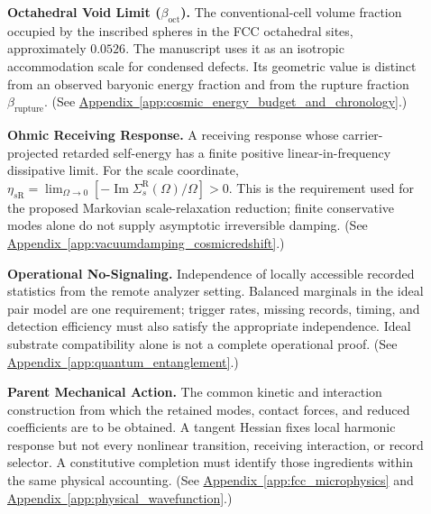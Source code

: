 \begin{description}
\item[] \begin{minipage}[t]{\linewidth}
\textbf{Octahedral Void Limit ($\beta_{\mathrm{oct}}$).} The conventional-cell volume fraction occupied by the inscribed spheres in the FCC octahedral sites, approximately $0.0526$. The manuscript uses it as an isotropic accommodation scale for condensed defects. Its geometric value is distinct from an observed baryonic energy fraction and from the rupture fraction $\beta_{\mathrm{rupture}}$.
(See \hyperref[app:cosmic_energy_budget_and_chronology]{Appendix~\ref*{app:cosmic_energy_budget_and_chronology}}.)
\end{minipage}

\item[] \begin{minipage}[t]{\linewidth}
\textbf{Ohmic Receiving Response.} A receiving response whose carrier-projected retarded self-energy has a finite positive linear-in-frequency dissipative limit. For the scale coordinate, $\eta_{s\mathrm R}=\lim_{\Omega\to0}[-\operatorname{Im}\Sigma_s^{\mathrm R}(\Omega)/\Omega]>0$. This is the requirement used for the proposed Markovian scale-relaxation reduction; finite conservative modes alone do not supply asymptotic irreversible damping.
(See \hyperref[app:vacuumdamping_cosmicredshift]{Appendix~\ref*{app:vacuumdamping_cosmicredshift}}.)
\end{minipage}

\item[] \begin{minipage}[t]{\linewidth}
\textbf{Operational No-Signaling.} Independence of locally accessible recorded statistics from the remote analyzer setting. Balanced marginals in the ideal pair model are one requirement; trigger rates, missing records, timing, and detection efficiency must also satisfy the appropriate independence. Ideal substrate compatibility alone is not a complete operational proof.
(See \hyperref[app:quantum_entanglement]{Appendix~\ref*{app:quantum_entanglement}}.)
\end{minipage}

\item[] \begin{minipage}[t]{\linewidth}
\textbf{Parent Mechanical Action.} The common kinetic and interaction construction from which the retained modes, contact forces, and reduced coefficients are to be obtained. A tangent Hessian fixes local harmonic response but not every nonlinear transition, receiving interaction, or record selector. A constitutive completion must identify those ingredients within the same physical accounting.
(See \hyperref[app:fcc_microphysics]{Appendix~\ref*{app:fcc_microphysics}} and \hyperref[app:physical_wavefunction]{Appendix~\ref*{app:physical_wavefunction}}.)
\end{minipage}


\end{description}
